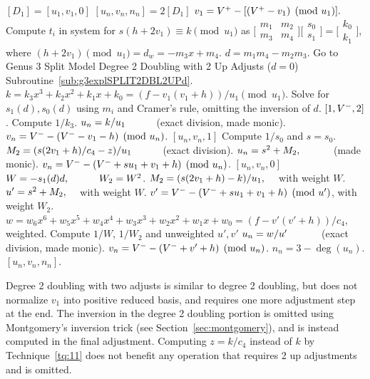 \begin{algorithm}[htbp]
\caption{Genus 3 Split Model Degree 2 Doubling with two Up Adjusts\label{alg:g3explSPLIT2DBL2UP}}
\begin{algorithmic} [1]
\Require $[D_1]= [u_1, v_1,0]$ \smallskip
\Ensure $[u_n,v_n,n_n] = 2[D_1]$
\algrule
\State $v_1 = V^{+} - [(V^{+} - v_1) \pmod{u_1}].$
\State Compute $t_i$ in system for $s(h + 2v_1)\equiv k \pmod{u_1}$ as $ \bigl[
\begin{smallmatrix} m_1 & m_2\\ m_3 & m_4\end{smallmatrix}\bigr] \bigl[
\begin{smallmatrix} s_0\\ s_1 \end{smallmatrix} \bigr ] = \bigl[ \begin{smallmatrix}k_0
\\  k_1\end{smallmatrix} \bigr ]$, where $(h + 2v_1) \pmod{u_1} = d_w = -m_3x + m_4.$
\State $d = m_1m_4 - m_2m_3$.
    \State Go to Genus 3 Split Model Degree 2 Doubling with 2 Up Adjusts ($d=0$) Subroutine~\ref{sub:g3explSPLIT2DBL2UPd}.
\EndIf
\State $k = k_3x^3 + k_2x^2 + k_1x + k_0 = (f - v_1(v_1 + h))/u_1 \pmod{u_1}.$
\State Solve for $s_1(d), s_0(d)$ using $m_i$ and Cramer's rule, omitting the inversion of $d$.
         \Return $[1,V^{-},2]$.
        \Else \hspace{3pt}Compute $1/k_3$.
            \State $u_n = k/u_1 \quad\quad\quad $(exact division, made monic).
            \State $v_n = V^{-} - (V^{-} - v_1 - h) \pmod{u_n}$.
            \State \Return $[u_n,v_n,1]$
        \EndIf
    \Else \hspace{3pt} Compute $1/s_0$ and $s= s_0$.
        \State $M_2 = (s(2v_1 + h)/c_4 - z)/u_1 \quad\quad\quad $(exact division).
        \State $u_n = s^2 + M_2, \quad\quad\quad $ (made monic).
        \State $v_n = V^{-} - (V^{-} + su_1 + v_1 + h) \pmod{u_n}$.
        \State \Return $[u_n,v_n,0]$
    \EndIf
\EndIf
\State $W = -s_1(d)d, \quad\quad\quad W_2 = W^2$.
\State $M_2 = (s(2v_1 + h)- k)/u_1, \quad$ with weight $W$.
\State $u' = s^2 + M_2, \quad $ with weight $W$.
\State $v' = V^{-} - (V^{-} + su_1 + v_1 + h) \pmod{u'}$, with weight $W_2$.
\State $w = w_6x^6 + w_5x^5 + w_4x^4 + w_3x^3 + w_2x^2 +w_1x + w_0 = (f - v'(v' + h))/c_4$, weighted.
\State Compute $1/W$, $1/W_2$ and unweighted $u',v'$
\State $u_n = w/u' \quad\quad\quad$ (exact division, made monic).
\State $v_n = V^{-} - (V^{-} + v' + h) \pmod{u_n}$.
\State $n_n = 3 - \deg(u_n)$.
\State \Return $[u_n, v_n,n_n]$.
\end{algorithmic}
\end{algorithm}
Degree 2 doubling with two adjusts is similar to degree 2 doubling, but does not
normalize $v_1$ into positive reduced basis, and requires one more adjustment
step at the end. The inversion in the degree 2 doubling portion is omitted using
Montgomery's inversion trick (see Section~\ref{sec:montgomery}), and is instead
computed in the final adjustment. Computing $z = k/c_4$ instead of $k$ by
Technique~\ref{tq:11} does not benefit any operation that requires 2 up
adjustments and is omitted. 


